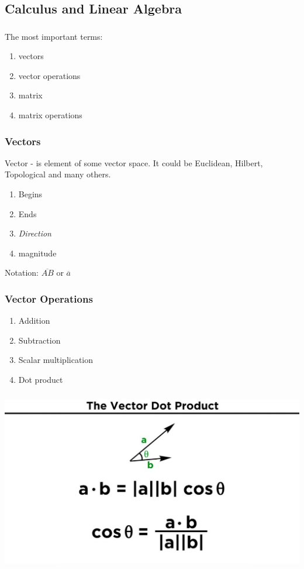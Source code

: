 \documentclass[t, 11pt]{beamer}
\begin{document}
	\subsection{Calculus and Linear Algebra }
	\begin{frame} 
		\frametitle{\insertsection} 
		\frametitle{\insertsubsection} 
		The most important terms:
		\begin{enumerate}
			\item vectors
			\item vector operations
			\item matrix
			\item matrix operations
		\end{enumerate}
	\end{frame}
	
	\begin{frame} 
		\frametitle{\insertsection} 
		\frametitle{Vectors} 
		Vector - is element of some vector space. It could be Euclidean, Hilbert, Topological and many others.  
		\begin{enumerate}
			\item Begins
			\item Ends
			\item \emph{Direction}
			\item magnitude
		\end{enumerate}
		\vspace{1cm}
		Notation: $\overline{AB}$ or $\overline{a}$
	\end{frame}
	
	\begin{frame} 
		\frametitle{\insertsection} 
		\frametitle{Vector Operations} 
		\begin{enumerate}
			\item Addition
			\item Subtraction
			\item Scalar multiplication
			\item Dot product 
		\end{enumerate}
		
	\end{frame}
	
	\begin{frame} 
		\frametitle{} 
		\frametitle{} 
		\includegraphics[scale=0.3]{dotprod}	
	\end{frame}	
	
\end{document}

